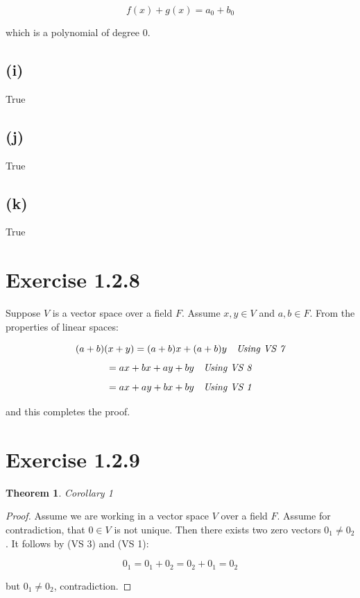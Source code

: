 \documentclass{article}
\newtheorem*{theorem}{Theorem}
\begin{document}
\begin{equation*}
    f(x) + g(x) = a_{0} + b_{0}
\end{equation*}

which is a polynomial of degree \(0\).

\subsection*{(i)}

True

\subsection*{(j)}

True

\subsection*{(k)}

True

\section*{Exercise 1.2.8}

Suppose \(V\) is a vector space over a field \(F\). Assume \(x, y \in V\) and \(a, b \in F\). From 
the properties of linear spaces:

\begin{equation*}
    (a + b)(x + y) = (a + b)x + (a + b)y \ \ \ \emph{Using  VS 7}
\end{equation*}
\begin{equation*}
    = ax + bx + ay + by \ \ \ \emph{Using VS 8}
\end{equation*}
\begin{equation*}
    = ax + ay + bx + by \ \ \ \emph{Using VS 1}
\end{equation*}

and this completes the proof.

\section*{Exercise 1.2.9}

\begin{theorem}
    Corollary 1
\end{theorem}
\begin{proof}
    Assume we are working in a vector space \(V\) over a field \(F\). Assume for contradiction,
that \(0 \in V\) is not unique. Then there exists two zero vectors \(0_{1} \neq 0_{2}\).
It follows by (VS 3) and (VS 1):

\begin{equation*}
    0_{1} = 0_{1} + 0_{2} = 0_{2} + 0_{1} = 0_{2}
\end{equation*}

but \(0_{1} \neq 0_{2}\), contradiction.
\end{proof}
\end{document}
